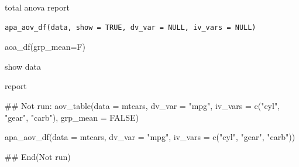 \documentclass[a4paper]{book}
\begin{document}
%
\begin{Description}
total anova report
\end{Description}
%
\begin{Usage}
\begin{verbatim}
apa_aov_df(data, show = TRUE, dv_var = NULL, iv_vars = NULL)
\end{verbatim}
\end{Usage}
%
\begin{Arguments}
\begin{ldescription}
\item[\code{data}] aoa\_df(grp\_mean=F)

\item[\code{show}] show data
\end{ldescription}
\end{Arguments}
%
\begin{Value}
report
\end{Value}
%
\begin{Examples}
\begin{ExampleCode}
\#\# Not run: 
aov_table(data = mtcars, dv_var = "mpg",
iv_vars = c("cyl", "gear", "carb"),
grp_mean = FALSE)%

apa_aov_df(data = mtcars, dv_var = "mpg",
 iv_vars = c("cyl", "gear", "carb"))

## End(Not run)


\end{ExampleCode}
\end{Examples}
\end{document}
